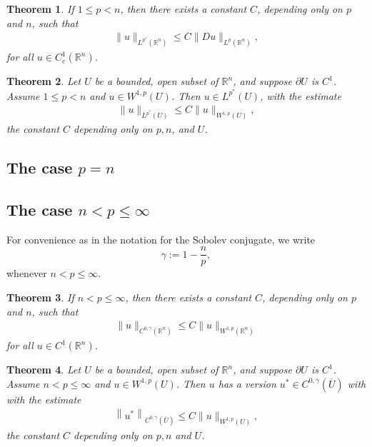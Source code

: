 \documentclass[11pt,a4paper]{report}
\newtheorem{theorem}{Theorem}[section]
\theoremstyle{definition}
\begin{document}
\begin{theorem}
    If $1 \leq p < n$, then there exists a constant $C$, depending only on $p$ and $n$, such that
    \begin{align*}
    \|u\|_{L^{p^*}\left(\mathbb{R}^n\right)} \leq C\|D u\|_{L^p\left(\mathbb{R}^n\right)},
    \end{align*}
    for all $u \in C_c^1\left(\mathbb{R}^n\right)$.
\end{theorem}

\begin{theorem}  
    Let $U$ be a bounded, open subset of $\mathbb{R}^n$, and suppose $\partial U$ is $C^1$. 
    Assume $1 \leq p < n$ and $u \in W^{1, p}(U)$. 
    Then $u \in L^{p^*}(U)$, with the estimate
    \begin{align*}
    \|u\|_{L^{p^*}(U)} \leq C\|u\|_{W^{1, p}(U)},
    \end{align*}
    the constant $C$ depending only on $p, n$, and $U$.
\end{theorem}

\subsection{The case $p=n$}

\subsection{The case $n < p \leq \infty$}

For convenience as in the notation for the Sobolev conjugate, we write 
\begin{equation*} 
    \gamma:=1- \frac{n}{p},
\end{equation*}
whenever $n < p \leq \infty$.

\begin{theorem}
    If $n < p \leq \infty$, then there exists a constant $C$, depending only on $p$ and $n$, such that
    \begin{align*}
    \|u\|_{C^{0, \gamma}\left(\mathbb{R}^n\right)} \leq C\|u\|_{W^{1, p}\left(\mathbb{R}^n\right)}
    \end{align*}
    for all $u \in C^1\left(\mathbb{R}^n\right)$.
\end{theorem}

\begin{theorem}
    Let $U$ be a bounded, open subset of $\mathbb{R}^n$, and suppose $\partial U$ is $C^1$. Assume $n < p \leq \infty$ and $u \in W^{1, p}(U)$. 
    Then $u$ has a version $u^{\ast} \in C^{0, \gamma}(\overline{U})$ with with the estimate
    \begin{align*}
        \left\|u^*\right\|_{C^{0, \gamma}(\bar{U})} \leq C\|u\|_{W^{1, p}(U)},
    \end{align*}
    the constant $C$ depending only on $p, n$ and $U$.
\end{theorem}
\end{document}
